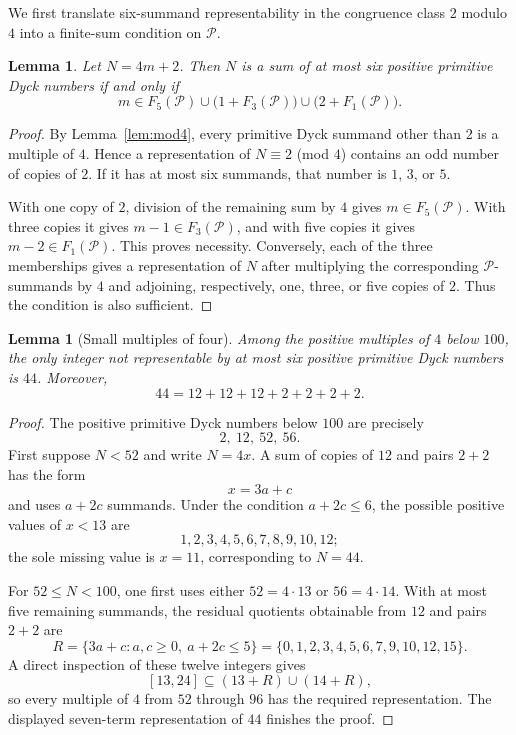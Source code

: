 \documentclass[12pt]{article}
\theoremstyle{plain}
\newtheorem{lemma}[theorem]{Lemma}
\newcommand{\Pset}{\mathcal P}
\begin{document}
We first translate six-summand representability in the congruence class
$2$ modulo $4$ into a finite-sum condition on $\Pset$.

\begin{lemma}\label{lem:sixcriterion}
Let $N=4m+2$.  Then $N$ is a sum of at most six positive primitive Dyck
numbers if and only if
\[
 m\in F_5(\Pset)
 \cup\bigl(1+F_3(\Pset)\bigr)
 \cup\bigl(2+F_1(\Pset)\bigr).
\]
\end{lemma}

\begin{proof}
By Lemma~\ref{lem:mod4}, every primitive Dyck summand other than $2$ is
a multiple of $4$.  Hence a representation of $N\equiv2$ (mod $4$) contains
an odd number of copies of $2$.  If it has at most six summands, that
number is $1$, $3$, or $5$.

With one copy of $2$, division of the remaining sum by $4$ gives
$m\in F_5(\Pset)$.  With three copies it gives
$m-1\in F_3(\Pset)$, and with five copies it gives
$m-2\in F_1(\Pset)$.  This proves necessity.  Conversely, each of the
three memberships gives a representation of $N$ after multiplying the
corresponding $\Pset$-summands by $4$ and adjoining, respectively, one,
three, or five copies of $2$.  Thus the condition is also sufficient.
\end{proof}

\begin{lemma}[Small multiples of four]\label{lem:smallmultiples}
Among the positive multiples of $4$ below $100$, the only integer not
representable by at most six positive primitive Dyck numbers is $44$.
Moreover,
\[
 44=12+12+12+2+2+2+2.
\]
\end{lemma}

\begin{proof}
The positive primitive Dyck numbers below $100$ are precisely
\[
 2,\ 12,\ 52,\ 56.
\]
First suppose $N<52$ and write $N=4x$.  A sum of copies of $12$ and
pairs $2+2$ has the form
\[
 x=3a+c
\]
and uses $a+2c$ summands.  Under the condition $a+2c\leq6$, the possible
positive values of $x<13$ are
\[
 1,2,3,4,5,6,7,8,9,10,12;
\]
the sole missing value is $x=11$, corresponding to $N=44$.

For $52\leq N<100$, one first uses either $52=4\cdot13$ or
$56=4\cdot14$.  With at most five remaining summands, the residual
quotients obtainable from $12$ and pairs $2+2$ are
\[
 R=\{3a+c:a,c\geq0,\ a+2c\leq5\}
   =\{0,1,2,3,4,5,6,7,9,10,12,15\}.
\]
A direct inspection of these twelve integers gives
\[
 [13,24]\subseteq(13+R)\cup(14+R),
\]
so every multiple of $4$ from $52$ through $96$ has the required
representation.  The displayed seven-term representation of $44$
finishes the proof.
\end{proof}
\end{document}
